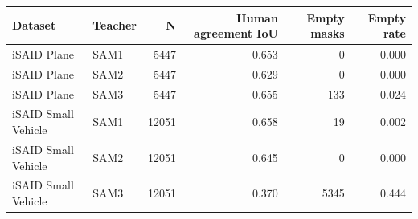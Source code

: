 \begin{tabular}{llrrrr}
\toprule
Dataset & Teacher & N & Human agreement IoU & Empty masks & Empty rate \\
\midrule
iSAID Plane & SAM1 & 5447 & 0.653 & 0 & 0.000 \\
iSAID Plane & SAM2 & 5447 & 0.629 & 0 & 0.000 \\
iSAID Plane & SAM3 & 5447 & 0.655 & 133 & 0.024 \\
iSAID Small Vehicle & SAM1 & 12051 & 0.658 & 19 & 0.002 \\
iSAID Small Vehicle & SAM2 & 12051 & 0.645 & 0 & 0.000 \\
iSAID Small Vehicle & SAM3 & 12051 & 0.370 & 5345 & 0.444 \\
\bottomrule
\end{tabular}
